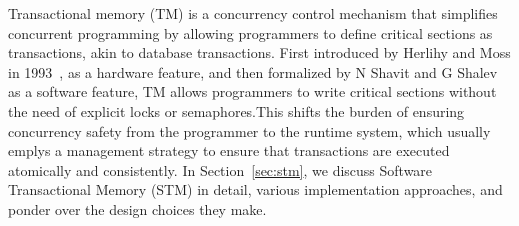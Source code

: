 Transactional memory (TM) is a concurrency control mechanism
that simplifies concurrent programming by allowing programmers
to define critical sections as transactions, akin to database transactions.
First introduced by Herlihy and Moss in 1993~\cite{herlihy1993transactional},
as a hardware feature, and then formalized by N Shavit and G Shalev~\cite{shavit1995software}
as a software feature, TM allows programmers to write critical sections without the need of 
explicit locks or semaphores.This shifts the burden of ensuring concurrency safety
from the programmer to the runtime system, which usually emplys a management strategy
to ensure that transactions are executed atomically and consistently.
In Section~\ref{sec:stm}, we discuss Software Transactional Memory (STM) in detail,
various implementation approaches, and ponder over the design choices they make. 